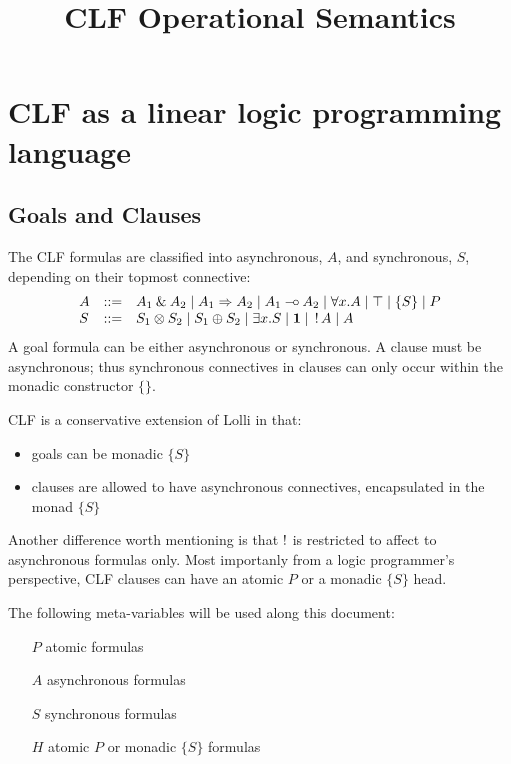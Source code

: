 \documentclass{article}
\title{CLF Operational Semantics}
\def\gror{\;\vert\;}
\begin{document}
\marginsize{2.0cm}{2.0cm}{1.5cm}{1.5cm}

\maketitle

\section{CLF as a linear logic programming language}

\subsection{Goals and Clauses}

The CLF formulas are classified into asynchronous, $A$, and 
synchronous, $S$, depending on their topmost connective:
$$
\begin{array}{lll}
A & ::=   & A_1 \with A_2 
      \gror A_1 \iimp A_2 
      \gror A_1 \limp A_2 
      \gror \forall x.A  
      \gror \top 
      \gror \{ S \} 
      \gror P 
\\
S & ::= &   S_1 \tensor S_2 
      \gror S_1 \oplus S_2 
      \gror \exists x.S 
      \gror \one 
      \gror \bang A
      \gror A
\end{array}
$$
A goal formula can be either asynchronous or synchronous.
A clause must be asynchronous; thus synchronous connectives
in clauses can only occur within the monadic constructor $\{\}$.

CLF is a conservative extension of Lolli in that:
\begin{itemize}
\item goals can be monadic $\{ S \}$
\item clauses are allowed to have asynchronous connectives, encapsulated in the monad $\{S\}$ 
\end{itemize}
Another difference worth mentioning is that $\mathop{!}$ is restricted 
to affect to asynchronous formulas only.
Most importanly from a logic programmer's perspective, CLF clauses 
can have an atomic $P$ or a monadic $\{S\}$ head. 

The following meta-variables will be used along this document:
\begin{itemize}
\item[$P$] atomic formulas
\item[$A$] asynchronous formulas
\item[$S$] synchronous formulas
\item[$H$] atomic $P$ or monadic $\{S\}$ formulas
\end{itemize}
\end{document}
